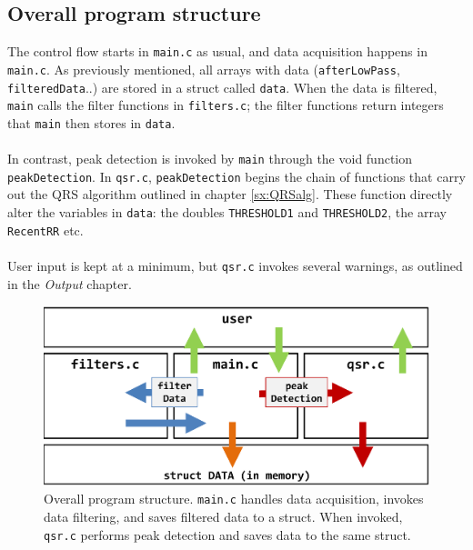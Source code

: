 \subsection{Overall program structure}
The control flow starts in \texttt{main.c} as usual, and data acquisition happens in \texttt{main.c}. As previously mentioned, all arrays with data (\texttt{afterLowPass}, \texttt{filteredData}..) are stored in a struct called \texttt{data}. When the data is filtered, \texttt{main} calls the filter functions in \texttt{filters.c}; the filter functions return integers that \texttt{main} then stores in \texttt{data}. \\
\\
In contrast, peak detection is invoked by \texttt{main} through the void function \texttt{peakDetection}. In \texttt{qsr.c}, \texttt{peakDetection} begins the chain of functions that carry out the QRS algorithm outlined in chapter \ref{sx:QRSalg}. These function directly alter the variables in \texttt{data}: the doubles \texttt{THRESHOLD1} and \texttt{THRESHOLD2}, the array \texttt{RecentRR} etc. \\
\\
User input is kept at a minimum, but \texttt{qsr.c} invokes several warnings, as outlined in the \textit{Output} chapter. 

\begin{figure}[H]
    \centering
    \includegraphics[width=1.0\textwidth]{2Implementation/fig/overall_program_structure.pdf}
    \caption{Overall program structure. \texttt{main.c} handles data acquisition, invokes data filtering, and saves filtered data to a struct. When invoked, \texttt{qsr.c} performs peak detection and saves data to the same struct.}
    \label{fig:overall_program_structure}
\end{figure}

